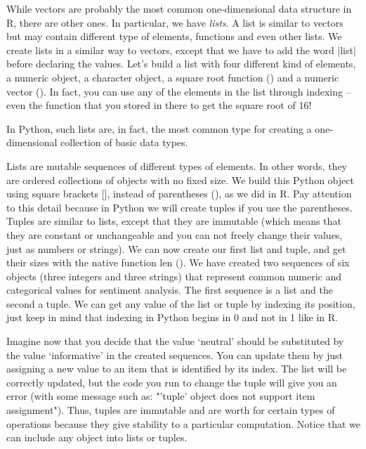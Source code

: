 


While vectors are probably the most common one-dimensional data
structure in R, there are other ones. In particular, we have
\emph{lists}. A list is similar to vectors but may contain different
type of elements, functions and even other lists. We create lists in a
similar way to vectors, except that we have to add the word |list|
before declaring the values. Let's build a list with four different
kind of elements, a numeric object, a character object, a square root
function () and a numeric vector (). In fact, you
can use any of the elements in the list through indexing -- even the
function  that you stored in there to get the square root of
16!




In Python, such lists are, in fact, the most common type for creating
a one-dimensional collection of basic data types. 

Lists are mutable sequences of different types of elements. In other
words, they are ordered collections of objects with no fixed size. We
build this Python object using square brackets [], instead of
parentheses (), as we did in R. Pay attention to this detail because
in Python we will create tuples if you use the parentheses. Tuples are
similar to lists, except that they are immutable (which means that
they are constant or unchangeable and you can not freely change their
values, just as numbers or strings).  We can now create our first list
and tuple, and get their sizes with the native function len
(). We have created two sequences of six objects
(three integers and three strings) that represent common numeric and
categorical values for sentiment analysis. The first sequence is a
list and the second a tuple. We can get any value of the list or tuple
by indexing its position, just keep in mind that indexing in Python
begins in 0 and not in 1 like in R.


Imagine now that you decide that the value `neutral' should be
substituted by the value `informative' in the created sequences. You
can update them by just assigning a new value to an item that is
identified by its index.  The list will be correctly updated, but the
code you run to change the tuple will give you an error (with some
message such as: "'tuple' object does not support item
assignment"). Thus, tuples are immutable and are worth for certain
types of operations because they give stability to a particular
computation. Notice that we can include any object into lists or
tuples.


